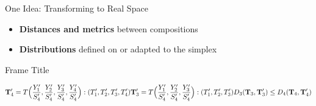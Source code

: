 \begin{frame}{One Idea: Transforming to Real Space}
{\begin{itemize}
        \item[3)] \textbf{Distances and metrics} between compositions
        \item[4)] \textbf{Distributions} defined on or adapted to the simplex
      \end{itemize}
}




\end{frame}

\begin{frame}{Frame Title}


\[
\mathbf{T}'_4 = T\Big(\frac{Y'_1}{S'_4},\frac{Y'_2}{S'_4},\frac{Y'_3}{S'_4},\frac{Y'_4}{S'_4}\Big):(T'_1,T'_2,T'_3,T'_4)
\\
\mathbf{T}'_3 = T\Big(\frac{Y'_1}{S'_4},\frac{Y'_2}{S'_4},\frac{Y'_3}{S'_4}\Big):(T'_1,T'_2,T'_3)
\\
D_3(\mathbf{T}_3,\mathbf{T}'_3) \le D_4(\mathbf{T}_4,\mathbf{T}'_4)
\]



\end{frame}


   

    

